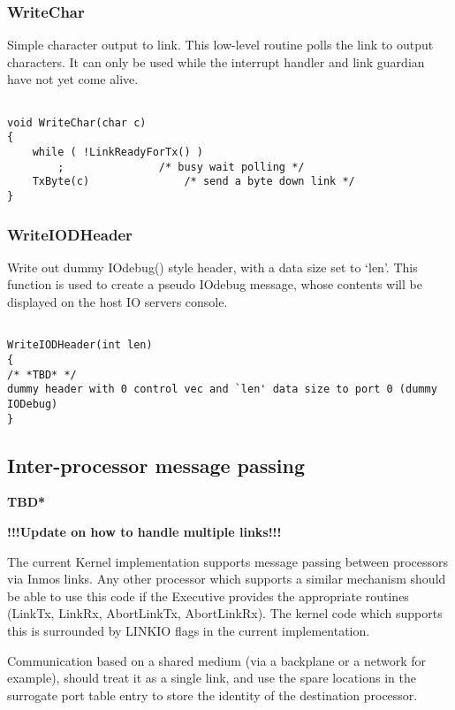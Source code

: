 \subsubsection{WriteChar}

Simple character output to link. This low-level routine polls the link to
output characters. It can only be used while the interrupt handler and
link guardian have not yet come alive.
\scriptsize
\begin{verbatim}

void WriteChar(char c)
{
    while ( !LinkReadyForTx() )
        ;               /* busy wait polling */
    TxByte(c)               /* send a byte down link */
}
\end{verbatim}
\normalsize

\subsubsection{WriteIODHeader}

Write out dummy IOdebug() style header, with a data size set to `len'. This
function is used to create a pseudo IOdebug message, whose contents will be
displayed on the host IO servers console.
\scriptsize
\begin{verbatim}

WriteIODHeader(int len)
{
/* *TBD* */
dummy header with 0 control vec and `len' data size to port 0 (dummy IODebug)
}
\end{verbatim}
\normalsize

\subsection{Inter-processor message passing}
{\bf *TBD*}

{\bf !!!Update on how to handle multiple links!!!}
\vspace{0.25cm}

The current Kernel implementation supports message passing between processors
via Inmos links. 
Any other processor which supports a similar mechanism should be able to use
this code if the Executive provides the appropriate routines (LinkTx, LinkRx,
AbortLinkTx, AbortLinkRx).
The kernel code which supports this is surrounded by LINKIO flags in the current
implementation.

Communication based on a shared medium (via a backplane or a network for 
example), should treat it as a single link, and use the spare locations in 
the surrogate port table entry to store the identity of the 
destination processor.

